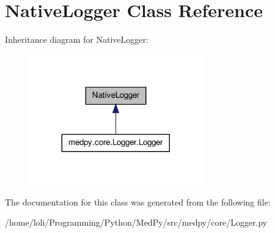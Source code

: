 \hypertarget{classNativeLogger}{
\section{NativeLogger Class Reference}
\label{classNativeLogger}
}


Inheritance diagram for NativeLogger:\nopagebreak
\begin{figure}[H]
\begin{center}
\leavevmode
\includegraphics[width=212pt]{classNativeLogger__inherit__graph}
\end{center}
\end{figure}


The documentation for this class was generated from the following file:\begin{DoxyCompactItemize}
\item 
/home/loli/Programming/Python/MedPy/src/medpy/core/Logger.py\end{DoxyCompactItemize}
